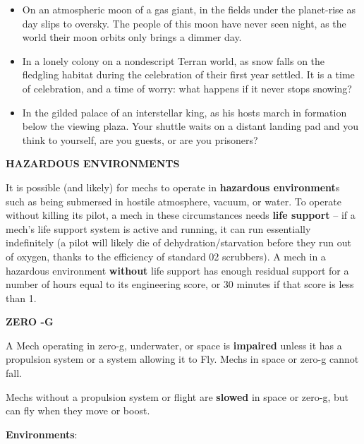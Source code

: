 \begin{itemize}
    \item On an atmospheric moon of a gas giant, in the fields under the planet-rise as day slips to oversky. The people of this moon have never seen night, as the world their moon orbits only brings a dimmer day.
    \item In a lonely colony on a nondescript Terran world, as snow falls on the fledgling habitat during the celebration of their first year settled. It is a time of celebration, and a time of worry: what happens if it never stops snowing?
    \item In the gilded palace of an interstellar king, as his hosts march in formation below the viewing plaza. Your shuttle waits on a distant landing pad and you think to yourself, are you guests, or are you prisoners?
\end{itemize}

\textbf{HAZARDOUS ENVIRONMENTS}

It is possible (and likely) for mechs to operate in \textbf{hazardous environment}s such as being
submersed in hostile atmosphere, vacuum, or water. To operate without killing its pilot, a mech in
these circumstances needs \textbf{life support} -- if a mech’s life support system is active and running,
it can run essentially indefinitely (a pilot will likely die of dehydration/starvation before they run
out of oxygen, thanks to the efficiency of standard 02 scrubbers). A mech in a hazardous
environment \textbf{without} life support has enough residual support for a number of hours equal to its
engineering score, or 30 minutes if that score is less than 1.

\begin{center}
    \textbf{ZERO -G}
\end{center}

A Mech operating in zero-g, underwater, or space is \textbf{impaired} unless it has a propulsion system
or a system allowing it to Fly. Mechs in space or zero-g cannot fall.

Mechs without a propulsion system or flight are \textbf{slowed} in space or zero-g, but can fly when
they move or boost.

\begin{center}
    \textbf{Environments}:
\end{center}


